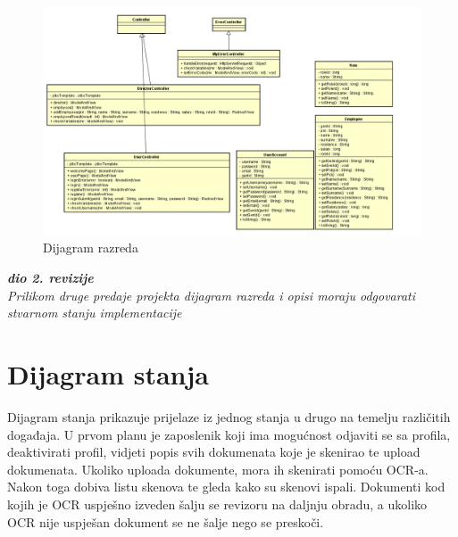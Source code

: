 			
			\begin{figure}[H]
				\includegraphics[scale=0.58]{slike/DijagramRazredaAlfa.png} %
				\centering
				\caption{Dijagram razreda}
				\label{DR1}
			\end{figure}
		
		
		
			
			\textbf{\textit{dio 2. revizije}}\\			
			
			\textit{Prilikom druge predaje projekta dijagram razreda i opisi moraju odgovarati stvarnom stanju implementacije}
			
			
			
			\eject
		
		\section{Dijagram stanja}
			
			Dijagram stanja prikazuje prijelaze iz jednog stanja u drugo na temelju različitih događaja. U prvom planu je zaposlenik koji ima mogućnost odjaviti se sa profila, deaktivirati profil, vidjeti popis svih dokumenata koje je skenirao te upload dokumenata. Ukoliko uploada dokumente, mora ih skenirati pomoću OCR-a. Nakon toga dobiva listu skenova te gleda kako su skenovi ispali. Dokumenti kod kojih je OCR uspješno izveden šalju se revizoru na daljnju obradu, a ukoliko OCR nije uspješan dokument se ne šalje nego se preskoči.
			
